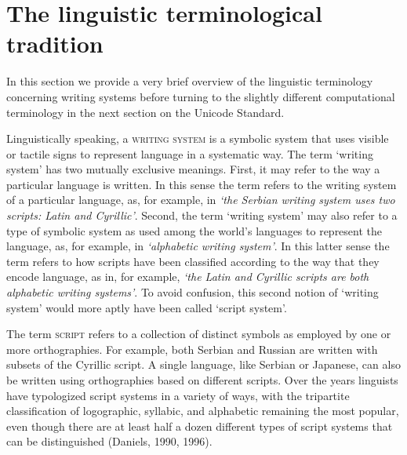 \section{The linguistic terminological tradition}
\label{the-linguistic-tradition}

In this section we provide a very brief overview of the linguistic terminology concerning writing systems before turning to the slightly different computational terminology in the next section on the Unicode Standard. 

Linguistically speaking, a \textsc{writing system} is a symbolic system that uses visible or tactile signs to represent language in a systematic way. The term `writing system' has two mutually exclusive meanings. First, it may refer to the way a particular language is written. In this sense the term refers to the writing system of a particular language, as, for example, in \emph{`the Serbian writing system uses two scripts: Latin and Cyrillic'}. Second, the term `writing system' may also refer to a type of symbolic system as used among the world's languages to represent the language, as, for example, in \emph{`alphabetic writing system'}. In this latter sense the term refers to how scripts have been classified according to the way that they encode language, as in, for example, \emph{`the Latin and Cyrillic scripts are both alphabetic writing systems'}. To avoid confusion, this second notion of `writing system' would more aptly have been called `script system'. 

The term \textsc{script} refers to a collection of distinct symbols as employed by one or more orthographies. For example, both Serbian and Russian are written with subsets of the Cyrillic script. A single language, like Serbian or Japanese, can also be written using orthographies based on different scripts. Over the years linguists have typologized script systems in a variety of ways, with the tripartite classification of logographic, syllabic, and alphabetic remaining the most popular, even though there are at least half a dozen different types of script systems that can be distinguished (Daniels, 1990, 1996).

